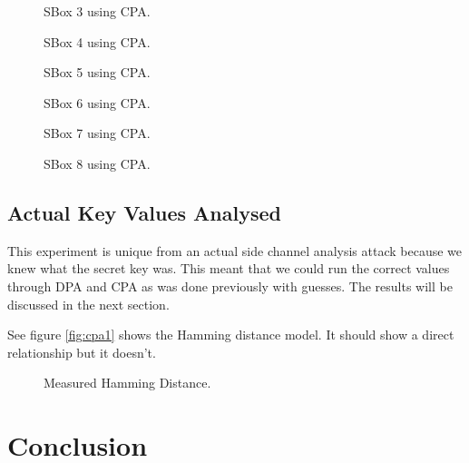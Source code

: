   \begin{figure}[h]
  
  \caption{SBox 3 using CPA.}
	\label{fig:cpa3}
  \end{figure}

  \begin{figure}[h]
  
  \caption{SBox 4 using CPA.}
	\label{fig:cpa4}
  \end{figure}

  \begin{figure}[h]
  
  \caption{SBox 5 using CPA.}
	\label{fig:cpa5}
  \end{figure}

  \begin{figure}[h]
  
  \caption{SBox 6 using CPA.}
	\label{fig:cpa6}
  \end{figure}

  \begin{figure}[h]
  
  \caption{SBox 7 using CPA.}
	\label{fig:cpa7}
  \end{figure}

  \begin{figure}[h]
  
  \caption{SBox 8 using CPA.}
	\label{fig:cpa8}
  \end{figure}

  
\subsection{Actual Key Values Analysed}
  This experiment is unique from an actual side channel analysis attack because we knew what the secret key was.  This meant that we could run the correct values through DPA and CPA as was done previously with guesses.  The results will be discussed in the next section.
  
  See figure \ref{fig:cpa1} shows the Hamming distance model.  It should show a direct relationship but it doesn't.
  
  \begin{figure}[h]
  
  \caption{Measured Hamming Distance.}
	\label{fig:cor}
  \end{figure}
  
\section{Conclusion}\label{sec::conclusion} 


